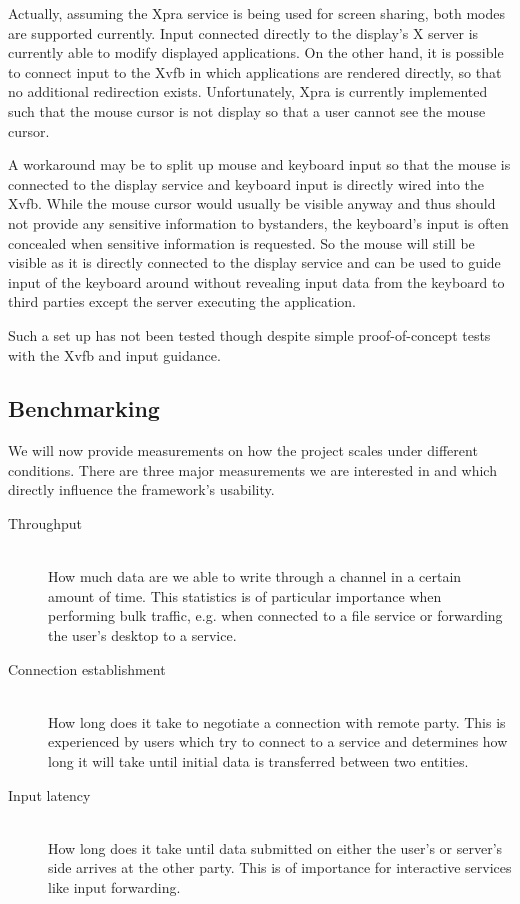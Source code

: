 Actually, assuming the Xpra service is being used for screen sharing, both modes are supported currently.
Input connected directly to the display's X server is currently able to modify displayed applications.
On the other hand, it is possible to connect input to the Xvfb in which applications are rendered directly, so that no additional redirection exists.
Unfortunately, Xpra is currently implemented such that the mouse cursor is not display so that a user cannot see the mouse cursor.

A workaround may be to split up mouse and keyboard input so that the mouse is connected to the display service and keyboard input is directly wired into the Xvfb.
While the mouse cursor would usually be visible anyway and thus should not provide any sensitive information to bystanders, the keyboard's input is often concealed when sensitive information is requested.
So the mouse will still be visible as it is directly connected to the display service and can be used to guide input of the keyboard around without revealing input data from the keyboard to third parties except the server executing the application.

Such a set up has not been tested though despite simple proof-of-concept tests with the Xvfb and input guidance.

\subsection{Benchmarking}
\label{sec:benchmarking}

We will now provide measurements on how the project scales under different conditions.
There are three major measurements we are interested in and which directly influence the framework's usability.
\begin{description}
    \item[Throughput]\hfill\\
        How much data are we able to write through a channel in a certain amount of time.
        This statistics is of particular importance when performing bulk traffic, e.g. when connected to a file service or forwarding the user's desktop to a service.
    \item[Connection establishment]\hfill\\
        How long does it take to negotiate a connection with remote party.
        This is experienced by users which try to connect to a service and determines how long it will take until initial data is transferred between two entities.
    \item[Input latency]\hfill\\
        How long does it take until data submitted on either the user's or server's side arrives at the other party.
        This is of importance for interactive services like input forwarding.
\end{description}

